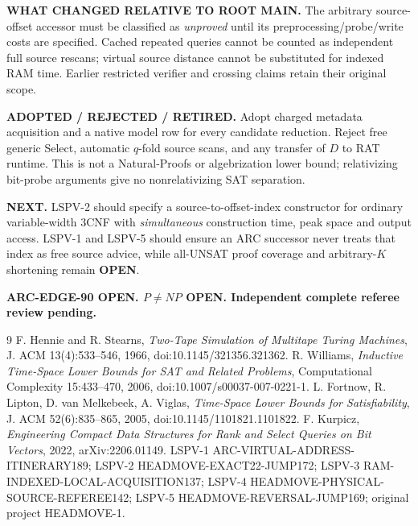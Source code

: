 \documentclass[11pt]{article}
\newcommand{\OPEN}{\textbf{OPEN}}
\begin{document}
\noindent\textbf{WHAT CHANGED RELATIVE TO ROOT MAIN.}
The arbitrary source-offset accessor must be classified as
\emph{unproved} until its preprocessing/probe/write costs are specified.
Cached repeated queries cannot be counted as independent full
source rescans; virtual source distance cannot be substituted
for indexed RAM time. Earlier restricted verifier and
crossing claims retain their original scope.

\noindent\textbf{ADOPTED / REJECTED / RETIRED.}
Adopt charged metadata acquisition and a native model row for
every candidate reduction. Reject free generic Select,
automatic \(q\)-fold source scans, and any transfer of \(D\)
to RAT runtime. This is not a Natural-Proofs or
algebrization lower bound; relativizing bit-probe arguments
give no nonrelativizing SAT separation.

\noindent\textbf{NEXT.}
LSPV-2 should specify a source-to-offset-index constructor
for ordinary variable-width 3CNF with \emph{simultaneous}
construction time, peak space and output access. LSPV-1 and
LSPV-5 should ensure an ARC successor never treats that
index as free source advice, while all-UNSAT proof coverage
and arbitrary-\(K\) shortening remain \OPEN.

\noindent\textbf{ARC-EDGE-90 OPEN. \(P\ne NP\) OPEN.
Independent complete referee review pending.}

\begin{thebibliography}{9}
 F. Hennie and R. Stearns,
\emph{Two-Tape Simulation of Multitape Turing Machines},
J. ACM 13(4):533--546, 1966, doi:10.1145/321356.321362.
 R. Williams,
\emph{Inductive Time-Space Lower Bounds for SAT and Related Problems},
Computational Complexity 15:433--470, 2006,
doi:10.1007/s00037-007-0221-1.
 L. Fortnow, R. Lipton, D. van Melkebeek, A. Viglas,
\emph{Time-Space Lower Bounds for Satisfiability},
J. ACM 52(6):835--865, 2005,
doi:10.1145/1101821.1101822.
 F. Kurpicz,
\emph{Engineering Compact Data Structures for Rank and Select Queries
on Bit Vectors}, 2022, arXiv:2206.01149.
 LSPV-1 ARC-VIRTUAL-ADDRESS-ITINERARY189;
LSPV-2 HEADMOVE-EXACT22-JUMP172; LSPV-3
RAM-INDEXED-LOCAL-ACQUISITION137; LSPV-4
HEADMOVE-PHYSICAL-SOURCE-REFEREE142; LSPV-5
HEADMOVE-REVERSAL-JUMP169; original project HEADMOVE-1.
\end{thebibliography}
\end{document}
